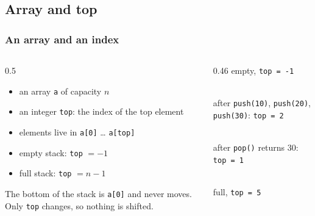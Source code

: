 \documentclass[aspectratio=169,10pt,compress]{beamer}
\begin{document}
\subsection[Idea]{Array and top}




\begin{frame}[t,fragile] \frametitle{An array and an index}
  \begin{columns}[T]
    \begin{column}{0.5\textwidth}
      \begin{itemize}
        \item an array \texttt{a} of capacity $n$
        \item an integer \texttt{top}: the index of the top element
        \item elements live in \texttt{a[0]} \dots{} \texttt{a[top]}
        \item empty stack: \texttt{top} $= -1$
        \item full stack: \texttt{top} $= n - 1$
      \end{itemize}
      \vspace{0.3em}
      \small The bottom of the stack is \texttt{a[0]} and never moves. Only \texttt{top} changes, so nothing is shifted.
    \end{column}
    \begin{column}{0.46\textwidth}
      \small empty, \texttt{top = -1}\\
      \\[0.4em]
      after \texttt{push(10)}, \texttt{push(20)}, \texttt{push(30)}: \texttt{top = 2}\\
      \\[0.4em]
      after \texttt{pop()} returns 30: \texttt{top = 1}\\
      \\[0.4em]
      full, \texttt{top = 5}\\
    \end{column}
  \end{columns}
\end{frame}
\end{document}
